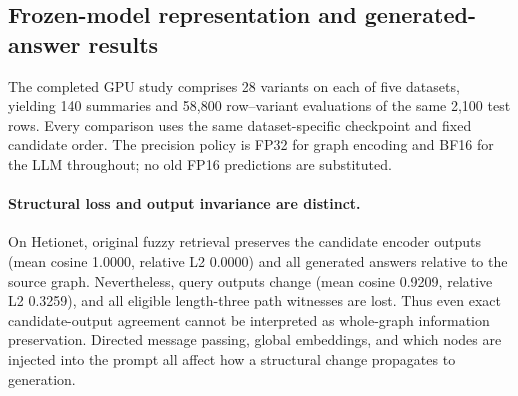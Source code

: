 \subsection{Frozen-model representation and generated-answer results}

The completed GPU study comprises 28 variants on each of five datasets,
yielding 140 summaries and 58,800 row--variant evaluations of the same 2,100
test rows. Every comparison uses the same dataset-specific checkpoint and
fixed candidate order. The precision policy is FP32 for graph encoding and
BF16 for the LLM throughout; no old FP16 predictions are substituted.

\begin{table}[t]
\centering\small
\caption{Exact generated-answer accuracy (\%) under the standardized matching
rule. Random rows average all five seeds. Source raw/unique and empty local
graph are diagnostic references with different budgets; the other rows use
matched unique-edge budgets. These are new frozen-model diagnostics, not replacements for
historical tables computed with other precision or scoring rules.}
\label{tab:c3-accuracy}
\resizebox{\textwidth}{!}{}
\end{table}

\begin{table}[t]
\centering\small
\caption{Original fuzzy versus the uncompressed source: encoder output changes
and normalized generated-answer agreement. Candidate metrics average the 20
candidate embeddings within each row, then average rows. A cosine near one
does not exclude a change in vector magnitude; relative L2 is reported
separately.}
\label{tab:c3-encoder}
\resizebox{\textwidth}{!}{}
\end{table}

\paragraph{Structural loss and output invariance are distinct.}
On Hetionet, original fuzzy retrieval preserves the candidate encoder outputs
(mean cosine 1.0000, relative L2 0.0000) and all generated answers relative to
the source graph. Nevertheless, query outputs change (mean cosine 0.9209,
relative L2 0.3259), and all eligible length-three path witnesses are lost.
Thus even exact candidate-output agreement cannot be interpreted as whole-graph
information preservation. Directed message passing, global embeddings, and
which nodes are injected into the prompt all affect how a structural change
propagates to generation.


